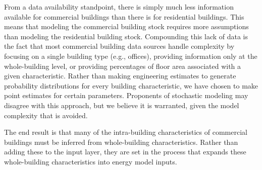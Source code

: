 From a data availability standpoint, there is simply much less information available for commercial buildings than there is for residential buildings. This means that modeling the commercial building stock requires more assumptions than modeling the residential building stock. Compounding this lack of data is the fact that most commercial building data sources handle complexity by focusing on a single building type (e.g., offices), providing information only at the whole-building level, or providing percentages of floor area associated with a given characteristic. Rather than making engineering estimates to generate probability distributions for every building characteristic, we have chosen to make point estimates for certain parameters. Proponents of stochastic modeling may disagree with this approach, but we believe it is warranted, given the model complexity that is avoided.

The end result is that many of the intra-building characteristics of commercial buildings must be inferred from whole-building characteristics. Rather than adding these to the input layer, they are set in the process that expands these whole-building characteristics into energy model inputs.
